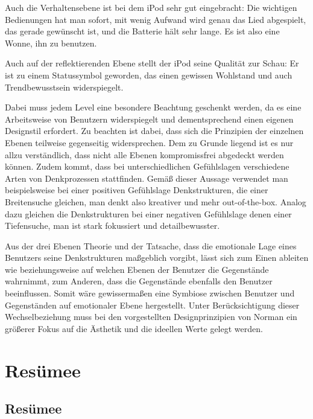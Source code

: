 \documentclass[parskip,headsepline, headtopline, %
footsepline, oneside, 12pt, headings=small]{scrreprt}
\begin{document}
Auch die Verhaltensebene ist bei dem iPod sehr gut eingebracht: Die wichtigen Bedienungen hat man sofort, mit wenig Aufwand wird genau das Lied abgespielt, das gerade gewünscht ist, und die Batterie hält sehr lange. Es ist also eine Wonne, ihn zu benutzen.

Auch auf der reflektierenden Ebene stellt der iPod seine Qualität zur Schau: Er ist zu einem Statussymbol geworden, das einen gewissen Wohlstand und auch Trendbewusstsein widerspiegelt. 


Dabei muss jedem Level eine besondere Beachtung geschenkt werden, da es eine Arbeitsweise von Benutzern widerspiegelt und dementsprechend einen eigenen Designstil erfordert. Zu beachten ist dabei, dass sich die Prinzipien der einzelnen Ebenen teilweise gegenseitig widersprechen. Dem zu Grunde liegend ist es nur allzu verständlich, dass nicht alle Ebenen kompromissfrei abgedeckt werden können. 
Zudem kommt, dass bei unterschiedlichen Gefühlslagen verschiedene Arten von Denkprozessen stattfinden. Gemäß dieser Aussage verwendet man beispielsweise bei einer positiven Gefühlslage Denkstrukturen, die einer Breitensuche gleichen, man denkt also kreativer und mehr out-of-the-box. Analog dazu gleichen die Denkstrukturen bei einer negativen Gefühlslage denen einer Tiefensuche, man ist stark fokussiert und detailbewusster.

Aus der drei Ebenen Theorie und der Tatsache, dass die emotionale Lage eines Benutzers seine Denkstrukturen maßgeblich vorgibt, lässt sich zum Einen ableiten wie beziehungsweise auf welchen Ebenen der Benutzer die Gegenstände wahrnimmt, zum Anderen, dass die Gegenstände ebenfalls den Benutzer beeinflussen. Somit wäre gewissermaßen eine Symbiose zwischen Benutzer und Gegenständen auf emotionaler Ebene hergestellt. Unter Berücksichtigung dieser Wechselbeziehung muss bei den vorgestellten Designprinzipien von Norman ein größerer Fokus auf die Ästhetik und die ideellen Werte gelegt werden.

 
\chapter{Resümee}
\section{Resümee}
\end{document}

